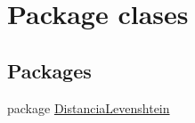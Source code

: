 \hypertarget{namespaceclases}{}\section{Package clases}
\label{namespaceclases}
\subsection*{Packages}
\begin{DoxyCompactItemize}
\item 
package \hyperlink{namespaceclases_1_1_distancia_levenshtein}{Distancia\+Levenshtein}
\end{DoxyCompactItemize}
